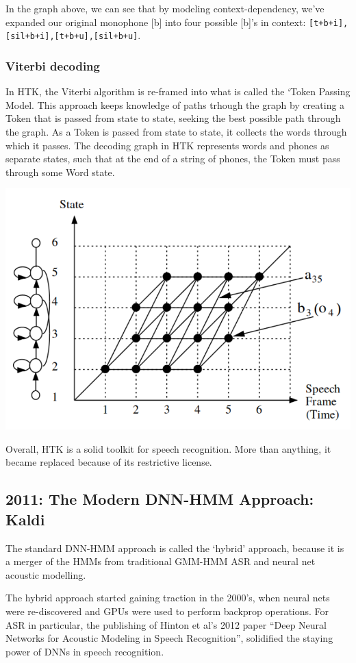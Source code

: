 \documentclass[10pt,a4paper]{article}
\begin{document}
In the graph above, we can see that by modeling context-dependency, we've expanded our original monophone [b] into four possible [b]'s in context: \texttt{[t+b+i],[sil+b+i],[t+b+u],[sil+b+u]}.



\subsubsection*{Viterbi decoding} 

In HTK, the Viterbi algorithm is re-framed into what is called the `Token Passing Model. This approach keeps knowledge of paths trhough the graph by creating a Token that is passed from state to state, seeking the best possible path through the graph. As a Token is passed from state to state, it collects the words through which it passes. The decoding graph in HTK represents words and phones as separate states, such that at the end of a string of phones, the Token must pass through some Word state. 

    
\begin{center}
  \includegraphics[width=.7\textwidth,keepaspectratio]{figs/htk-viterbi.png}
\end{center}


Overall, HTK is a solid toolkit for speech recognition. More than anything, it became replaced because of its restrictive license.


\subsection{2011: The Modern DNN-HMM Approach: Kaldi}

The standard DNN-HMM approach is called the `hybrid' approach, because it is a merger of the HMMs from traditional GMM-HMM ASR and neural net acoustic modelling.

The hybrid approach started gaining traction in the 2000's, when neural nets were re-discovered and GPUs were used to perform backprop operations. For ASR in particular, the publishing of Hinton et al's 2012 paper ``Deep Neural Networks for Acoustic Modeling in Speech Recognition'', solidified the staying power of DNNs in speech recognition.
\end{document}
